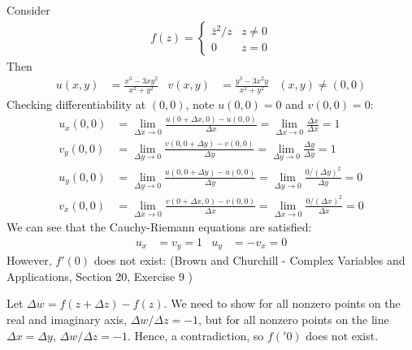 \documentclass[12pt, english]{book}
\begin{document}
	\begin{example}
	\label{f(z) satisfy Cauchy-Riemann but f'(z_0) does not exist Example - Complex}
		Consider
		\begin{align*}
			f(z) = 
			\begin{cases}
				\bar{z}^2 / z & z \neq 0 \\
				0			  & z = 0
			\end{cases}
		\end{align*}
		Then
		\begin{align*}
			u(x,y) &= \frac{x^3 - 3xy^2}{x^2 + y^2} &
			v(x,y) &= \frac{y^3 - 3x^2y}{x^2 + y^2} & (x,y) \neq (0,0)
		\end{align*}
		Checking differentiability at \((0,0)\), note \(u(0,0) = 0\) and \(v(0,0) = 0\):
		\begin{align*}
			u_x(0,0) 
			&= \lim_{\Delta x \rightarrow 0} \frac{u(0+\Delta x, 0) - u(0,0)}{\Delta x}
			 = \lim_{\Delta x \rightarrow 0} \frac{\Delta x}{\Delta x} = 1 \\
			v_y(0,0) 
			&= \lim_{\Delta y \rightarrow 0} \frac{v(0, 0+\Delta y) - v(0,0)}{\Delta y}
			 = \lim_{\Delta y \rightarrow 0} \frac{\Delta y}{\Delta y} = 1 \\
			u_y(0,0) 
			 &= \lim_{\Delta y \rightarrow 0} \frac{u(0, 0+\Delta y) - u(0,0)}{\Delta y}
			  = \lim_{\Delta y \rightarrow 0} \frac{0/(\Delta y)^2}{\Delta y} = 0 \\
			v_x(0,0) 
			 &= \lim_{\Delta x \rightarrow 0} \frac{v(0+\Delta x, 0) - v(0,0)}{\Delta x}
			  = \lim_{\Delta x \rightarrow 0} \frac{0/(\Delta x)^2}{\Delta x} = 0
		\end{align*}
		We can see that the Cauchy-Riemann equations are satisfied: 
		\begin{align*}
			u_x &= v_y = 1	&	u_y &= -v_x = 0
		\end{align*}
		However, \(f'(0)\) does not exist: (Brown and Churchill - Complex Variables and Applications, Section 20, Exercise 9 \cite{Brown.J;Churchill.R-Complex-Variables-2014})
		
		Let \(\Delta w = f(z + \Delta z) - f(z)\). We need to show for all nonzero points on the real and imaginary axis, \(\Delta w/\Delta z = -1\), but for all nonzero points on the line \(\Delta x = \Delta y\), \(\Delta w / \Delta z = -1\). Hence, a contradiction, so \(f('0)\) does not exist.
		

\end{example}
\end{document}
